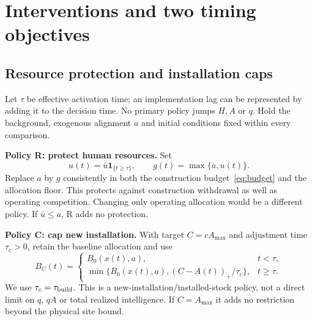 \documentclass[12pt,a4paper]{article}
\theoremstyle{remark}
\newcommand{\ind}{\mathbf{1}}
\begin{document}
\section{Interventions and two timing objectives}\label{sec:policy}
\subsection{Resource protection and installation caps}
Let $\tau$ be effective activation time; an implementation lag can be represented by adding it to the decision time. No primary policy jumps $H,A$ or $q$. Hold the background, exogenous alignment $a$ and initial conditions fixed within every comparison.

\textbf{Policy R: protect human resources.} Set
\begin{equation}
u(t)=\bar u\ind_{\{t\ge\tau\}},\qquad g(t)=\max\{a,u(t)\}.
\end{equation}
Replace $a$ by $g$ consistently in both the construction budget~\eqref{eq:budget} and the allocation floor. This protects against construction withdrawal as well as operating competition. Changing only operating allocation would be a different policy. If $\bar u\le a$, R adds no protection.

\textbf{Policy C: cap new installation.} With target $C=cA_{\max}$ and adjustment time $\tau_c>0$, retain the baseline allocation and use
\begin{equation}\label{eq:cap}
B_C(t)=\begin{cases}
B_0(x(t),a),&t<\tau,\\
\min\{B_0(x(t),a),(C-A(t))_+/\tau_c\},&t\ge\tau.
\end{cases}
\end{equation}
We use $\tau_c=\tau_{\rm build}$. This is a new-installation/installed-stock policy, not a direct limit on $q$, $qA$ or total realized intelligence. If $C=A_{\max}$ it adds no restriction beyond the physical site bound.
\end{document}
